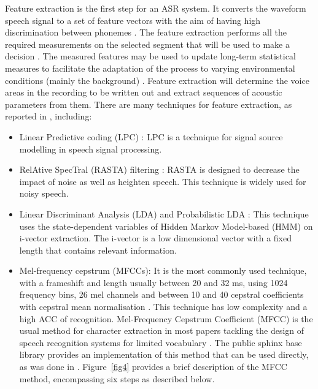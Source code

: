 Feature extraction is the first step for an ASR system. It converts the waveform speech signal to a set of feature vectors with the aim of having high discrimination between phonemes . The feature extraction performs all the required measurements on the selected segment that will be used to make a decision . The measured features may be used to update long-term statistical measures to facilitate the adaptation of the process to varying environmental conditions (mainly the background) . Feature extraction will determine the voice areas in the recording to be written out and extract sequences of acoustic parameters from them. There are many techniques for feature extraction, as reported in  , including:
\begin{itemize}
    \item Linear Predictive coding (LPC) : LPC is a technique for signal source modelling in speech signal processing. 
    \item RelAtive SpecTral (RASTA) filtering : RASTA is designed to decrease the impact of noise as well as heighten speech. This technique is widely used for noisy speech.
    \item Linear Discriminant Analysis (LDA) and Probabilistic LDA : This technique uses the state-dependent variables of Hidden Markov Model-based (HMM) on i-vector extraction. The i-vector is a low dimensional vector with a fixed length that contains relevant information.
    \item Mel-frequency cepstrum (MFCCs): It is the most commonly used technique, with a frameshift and length usually between 20 and 32 ms, using 1024 frequency bins, 26 mel channels and between 10 and 40 cepstral coefficients with cepstral mean normalisation . This technique has low complexity and a high ACC of recognition. Mel-Frequency Cepstrum Coefficient (MFCC) is the usual method for character extraction in most papers tackling the design of speech recognition systems for limited vocabulary . The public sphinx base library provides an implementation of this method that can be used directly, as was done in . Figure~\ref{fig4} provides a brief description of the MFCC method, encompassing six steps as described below. 
\end{itemize}
